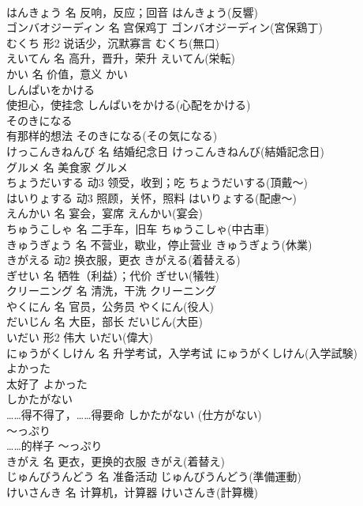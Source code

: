 \documentclass[8pt]{extreport}
\begin{document}
\begin{CJK}{UTF8}{min}
\\	はんきょう	名	反响，反应；回音	はんきょう(反響)	
\\	ゴンバオジーディン	名	宫保鸡丁	ゴンバオジーディン(宮保鶏丁)	
\\	むくち	形2	说话少，沉默寡言	むくち(無口)	
\\	えいてん	名	高升，晋升，荣升	えいてん(栄転)	
\\	かい	名	价值，意义	かい	
\\	しんぱいをかける	
\\	使担心，使挂念	しんぱいをかける(心配をかける)	
\\	そのきになる	
\\	有那样的想法	そのきになる(その気になる)	
\\	けっこんきねんび	名	结婚纪念日	けっこんきねんび(結婚記念日)	
\\	グルメ	名	美食家	グルメ	
\\	ちょうだいする	动3	领受，收到；吃	ちょうだいする(頂戴～)	
\\	はいりょする	动3	照顾，关怀，照料	はいりょする(配慮～)	
\\	えんかい	名	宴会，宴席	えんかい(宴会)	
\\	ちゅうこしゃ	名	二手车，旧车	ちゅうこしゃ(中古車)	
\\	きゅうぎょう	名	不营业，歇业，停止营业	きゅうぎょう(休業)	
\\	きがえる	动2	换衣服，更衣	きがえる(着替える)	
\\	ぎせい	名	牺牲（利益）；代价	ぎせい(犠牲)	
\\	クリーニング	名	清洗，干洗	クリーニング	
\\	やくにん	名	官员，公务员	やくにん(役人)	
\\	だいじん	名	大臣，部长	だいじん(大臣)	
\\	いだい	形2	伟大	いだい(偉大)	
\\	にゅうがくしけん	名	升学考试，入学考试	にゅうがくしけん(入学試験)	
\\	よかった	
\\	太好了	よかった	
\\	しかたがない	
\\	……得不得了，……得要命	しかたがない (仕方がない)	
\\	～っぷり	
\\	……的样子	～っぷり	
\\	きがえ	名	更衣，更换的衣服	きがえ(着替え)	
\\	じゅんびうんどう	名	准备活动	じゅんびうんどう(準備運動)	
\\	けいさんき	名	计算机，计算器	けいさんき(計算機)	

\end{CJK}
\end{document}
